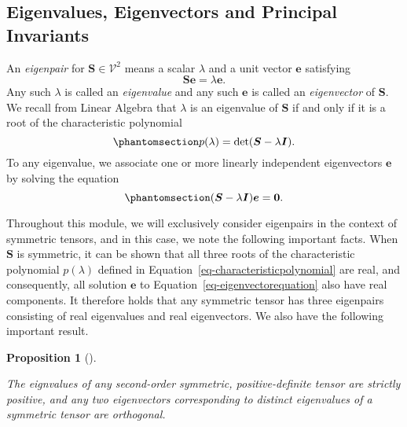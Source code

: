 \documentclass[
  letterpaper,
  DIV=11,
  numbers=noendperiod]{scrreprt}
\theoremstyle{plain}
\newtheorem{proposition}{Proposition}[chapter]
\theoremstyle{remark}
\begin{document}
\subsection{Eigenvalues, Eigenvectors and Principal
Invariants}\label{sec-eigenv-eigenv-princ}

An \emph{eigenpair} for \({\boldsymbol{S}}\in{\mathcal{V}}^2\) means a
scalar \(\lambda\) and a unit vector \({\boldsymbol{e}}\) satisfying
\[{\boldsymbol{S}}{\boldsymbol{e}}=\lambda{\boldsymbol{e}}.\] Any such
\(\lambda\) is called an \emph{eigenvalue} and any such
\({\boldsymbol{e}}\) is called an \emph{eigenvector} of
\({\boldsymbol{S}}\). We recall from Linear Algebra that \(\lambda\) is
an eigenvalue of \({\boldsymbol{S}}\) if and only if it is a root of the
characteristic polynomial
\begin{equation}\phantomsection\label{eq-characteristicpolynomial}{
  p(\lambda)=\det({\boldsymbol{S}}-\lambda {\boldsymbol{I}}).
}\end{equation} To any eigenvalue, we associate one or more linearly
independent eigenvectors \({\boldsymbol{e}}\) by solving the equation
\begin{equation}\phantomsection\label{eq-eigenvectorequation}{
  ({\boldsymbol{S}}-\lambda{\boldsymbol{I}}){\boldsymbol{e}}= \bf0.
}\end{equation}

Throughout this module, we will exclusively consider eigenpairs in the
context of symmetric tensors, and in this case, we note the following
important facts. When \({\boldsymbol{S}}\) is symmetric, it can be shown
that all three roots of the characteristic polynomial \(p(\lambda)\)
defined in Equation~\ref{eq-characteristicpolynomial} are real, and
consequently, all solution \({\boldsymbol{e}}\) to
Equation~\ref{eq-eigenvectorequation} also have real components. It
therefore holds that any symmetric tensor has three eigenpairs
consisting of real eigenvalues and real eigenvectors. We also have the
following important result.

\begin{proposition}[]\protect\hypertarget{prp-symmetriceigs}{}\label{prp-symmetriceigs}

The eignvalues of any second-order symmetric, positive-definite tensor
are strictly positive, and any two eigenvectors corresponding to
distinct eigenvalues of a symmetric tensor are orthogonal.

\end{proposition}
\end{document}
